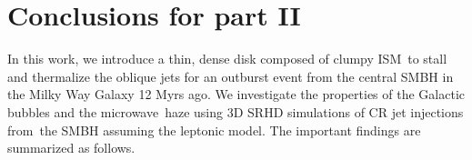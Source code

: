 
\chapter{Conclusions for part II}
\label{c:conclusions-2}

\label{Conclusions}
In this work, we introduce a thin, dense disk composed of clumpy ISM\
to stall and thermalize the oblique jets for an outburst event from
the central SMBH in the Milky Way Galaxy 12 Myrs ago.
We investigate the properties of the Galactic bubbles and the microwave\
haze using 3D SRHD simulations of CR jet injections from\
the SMBH assuming the leptonic model. The important findings are summarized as follows.

